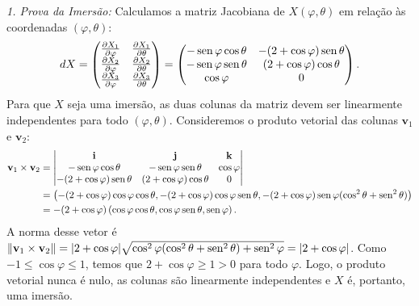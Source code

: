 {	\textit{1. Prova da Imersão:}
	Calculamos a matriz Jacobiana de $X(\varphi, \theta)$ em relação às coordenadas $(\varphi, \theta)$:
	\begin{equation*}
		dX = \begin{pmatrix} 
			\tfrac{\partial X_1}{\partial \varphi} & \tfrac{\partial X_1}{\partial \theta} \\ 
			\tfrac{\partial X_2}{\partial \varphi} & \tfrac{\partial X_2}{\partial \theta} \\ 
			\tfrac{\partial X_3}{\partial \varphi} & \tfrac{\partial X_3}{\partial \theta} 
		\end{pmatrix} = 
		\begin{pmatrix} 
			-\operatorname{sen} \varphi \cos \theta & -(2 + \cos \varphi) \operatorname{sen} \theta \\ 
			-\operatorname{sen} \varphi \operatorname{sen} \theta & (2 + \cos \varphi) \cos \theta \\ 
			\cos \varphi & 0 
		\end{pmatrix}.
	\end{equation*}
	Para que $X$ seja uma imersão, as duas colunas da matriz devem ser linearmente independentes para todo $(\varphi, \theta)$. Consideremos o produto vetorial das colunas $\mathbf{v}_1$ e $\mathbf{v}_2$:
	\begin{align*}
		\mathbf{v}_1 \times \mathbf{v}_2 &= 
		\begin{vmatrix} 
			\mathbf{i} & \mathbf{j} & \mathbf{k} \\ 
			-\operatorname{sen} \varphi \cos \theta & -\operatorname{sen} \varphi \operatorname{sen} \theta & \cos \varphi \\ 
			-(2 + \cos \varphi) \operatorname{sen} \theta & (2 + \cos \varphi) \cos \theta & 0 
		\end{vmatrix} \\
		&= \left( -(2 + \cos \varphi)\cos \varphi \cos \theta, -(2 + \cos \varphi)\cos \varphi \operatorname{sen} \theta, -(2 + \cos \varphi)\operatorname{sen} \varphi (\cos^2 \theta + \operatorname{sen}^2 \theta) \right) \\
		&= -(2 + \cos \varphi) \left( \cos \varphi \cos \theta, \cos \varphi \operatorname{sen} \theta, \operatorname{sen} \varphi \right).
	\end{align*}
	A norma desse vetor é $\|\mathbf{v}_1 \times \mathbf{v}_2\| = |2 + \cos \varphi| \sqrt{\cos^2 \varphi (\cos^2 \theta + \operatorname{sen}^2 \theta) + \operatorname{sen}^2 \varphi} = |2 + \cos \varphi|$.
	Como $-1 \leq \cos \varphi \leq 1$, temos que $2 + \cos \varphi \geq 1 > 0$ para todo $\varphi$. Logo, o produto vetorial nunca é nulo, as colunas são linearmente independentes e $X$ é, portanto, uma imersão.
	
}
